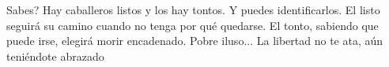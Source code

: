 
\beginverse
    Sabes? Hay caballeros listos y los hay tontos. Y puedes identificarlos.
    El listo seguirá su camino cuando no tenga por qué quedarse.
    El tonto, sabiendo que puede irse, elegirá morir encadenado.
    Pobre iluso... La libertad no te ata, aún teniéndote abrazado
\endverse
